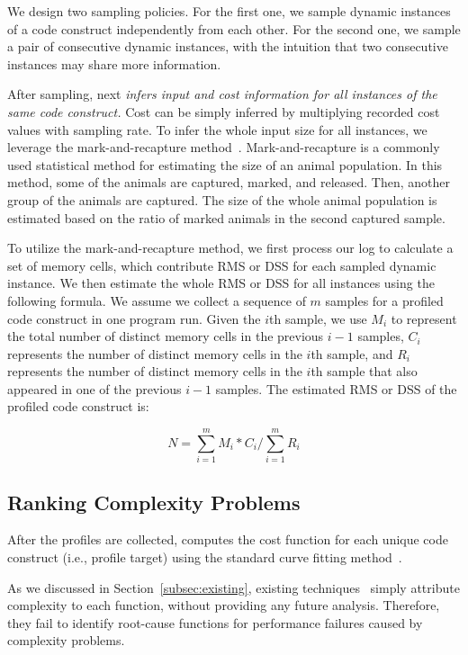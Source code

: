 {{We design two sampling policies. 
For the first one, we sample dynamic instances of a code construct 
independently from each other.
For the second one, we sample a pair of consecutive dynamic instances, 
with the intuition that two consecutive 
instances may share more information.


After sampling, \Tool next \emph{infers input and cost information
for all instances of the same code construct.} 
Cost can be simply inferred by multiplying recorded cost values with sampling rate.
To infer the whole input size for all instances, 
we leverage the mark-and-recapture method~\cite{mark-recapture}. 
Mark-and-recapture is a commonly used statistical method 
for estimating the size of an animal population. 
In this method, some of the animals are captured, marked, and released. 
Then, another group of the animals are captured.
The size of the whole animal population is estimated 
based on the ratio of marked animals in the second captured sample. 
 

To utilize the mark-and-recapture method, 
we first process our log to calculate a set of memory cells, 
which contribute RMS
or DSS for each sampled dynamic instance. 
We then estimate the whole RMS or DSS for all instances using the following formula.
We assume we collect a sequence of $m$ samples for a profiled code construct 
in one program run.
Given the $i$th sample, we use $M_i$ to represent the 
total number of distinct memory cells in the previous $i-1$ samples, 
$C_i$ represents the number of distinct memory cells in the $i$th sample,
and $R_i$ represents the number of distinct memory cells in 
the $i$th sample that also appeared in one of the previous $i-1$ samples.
The estimated RMS or DSS of the profiled code construct is:

\begin{equation} \label{eq:mark}
N = \sum\limits_{i=1}^m M_i*C_i\Big/\sum\limits_{i=1}^m R_i
\end{equation}

\subsection{Ranking Complexity Problems}

After the profiles are collected, \Tool computes
the cost function for each unique code construct
(i.e., profile target) using the standard curve fitting 
method~\cite{curve-fitting,curve-bounding}. 

 
As we discussed in Section~\ref{subsec:existing}, 
existing techniques~\cite{Aprof1,Aprof2,AlgoProf} 
simply attribute complexity to each function, 
without providing any future analysis. 
Therefore, they fail to identify root-cause functions for 
performance failures caused by complexity problems. 

}}
